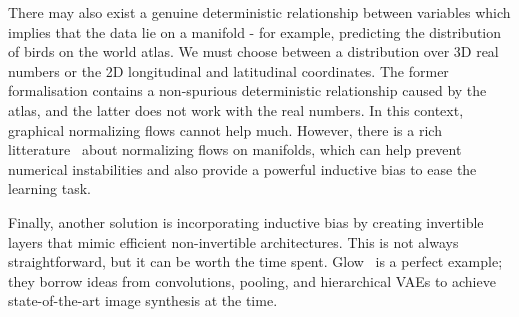 There may also exist a genuine deterministic relationship between variables which implies that the data lie on a manifold - for example, predicting the distribution of birds on the world atlas. We must choose between a distribution over 3D real numbers or the 2D longitudinal and latitudinal coordinates. The former formalisation contains a non-spurious deterministic relationship caused by the atlas, and the latter does not work with the real numbers. In this context, graphical normalizing flows cannot help much. However, there is a rich litterature~\citep{kohler2021smooth, mathieu2020riemannian, gemici2016normalizing, kalatzis2021multi, rezende2020normalizing} about normalizing flows on manifolds, which can help prevent numerical instabilities and also provide a powerful inductive bias to ease the learning task.

Finally, another solution is incorporating inductive bias by creating invertible layers that mimic efficient non-invertible architectures. This is not always straightforward, but it can be worth the time spent. Glow~\citep{kingma_glow_2018} is a perfect example; they borrow ideas from convolutions, pooling, and hierarchical VAEs to achieve state-of-the-art image synthesis at the time.




